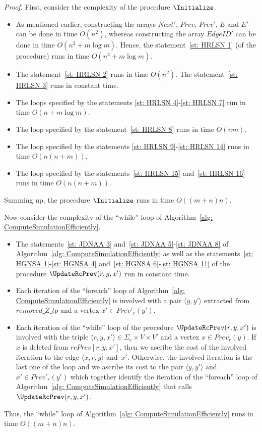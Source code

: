 \documentclass[11pt]{article}
\def\tuple#1{\langle#1\rangle}
\newcommand{\SE}{\Sigma_e}
\newcommand{\Prev}{\mathit{Prev}}
\newcommand{\NextP}{\mathit{Next}'}
\newcommand{\PrevP}{\mathit{Prev}'}
\newcommand{\removeZ}{\textit{removed\_Z\_tp}}
\newcommand{\EdgeIDp}{\mathit{EdgeID}'}
\newcommand{\rcPrev}{\mathit{rcPrev}}
\newenvironment{proof}{
	
	\smallskip
	
	\noindent
	{\em Proof.}}{
	
	\smallskip
	
}
\begin{document}
\begin{proof}
First, consider the complexity of the procedure $\Initialize$.
\begin{itemize}
\item As mentioned earlier, constructing the arrays $\NextP$, $\Prev$, $\PrevP$, $E$ and $E'$ can be done in time $O(n^2)$, whereas constructing the array $\EdgeIDp$ can be done in time $O(n^2 + m\log{m})$. Hence, the statement~\ref{st: HRLSN 1} (of the procedure) runs in time $O(n^2 + m\log{m})$. 
\item The statement~\ref{st: HRLSN 2} runs in time $O(n^2)$. The statement~\ref{st: HRLSN 3} runs in constant time.
\item The loops specified by the statements \ref{st: HRLSN 4}-\ref{st: HRLSN 7} run in time $O(n + m\log{m})$.  
\item The loop specified by the statement~\ref{st: HRLSN 8} runs in time $O(nm)$.  
\item The loop specified by the statements \ref{st: HRLSN 9}-\ref{st: HRLSN 14} runs in time $O(n(n+m))$.  
\item The loop specified by the statements~\ref{st: HRLSN 15} and~\ref{st: HRLSN 16} runs in time $O(n(n+m))$.  
\end{itemize}
Summing up, the procedure $\Initialize$ runs in time $O((m+n)n)$. 

Now consider the complexity of the ``while'' loop of Algorithm~\ref{alg: ComputeSimulationEfficiently}.
\begin{itemize}
\item The statements~\ref{st: JDNAA 3} and~\ref{st: JDNAA 5}-\ref{st: JDNAA 8} of Algorithm~\ref{alg: ComputeSimulationEfficiently} as well as the statements~\ref{st: HGNSA 1}-\ref{st: HGNSA 4} and~\ref{st: HGNSA 6}-\ref{st: HGNSA 11} of the procedure $\UpdateRcPrev(r,y,x')$ run in constant time. 
\item Each iteration of the ``foreach'' loop of Algorithm~\ref{alg: ComputeSimulationEfficiently} is involved with a pair $\tuple{y,y'}$ extracted from $\removeZ$ and a vertex $x' \in \PrevP_r(y')$. 

\item Each iteration of the ``while'' loop of the procedure $\UpdateRcPrev(r,y,x')$ is involved with the triple $\tuple{r,y,x'} \in \SE \times V \times V'$ and a vertex $x \in \Prev_r(y)$. 
%
If $x$ is deleted from $\rcPrev[r,y,x']$, then we ascribe the cost of the involved iteration to the edge $\tuple{x,r,y}$ and~$x'$. Otherwise, the involved iteration is the last one of the loop and we ascribe its cost to the pair $\tuple{y,y'}$ and $x' \in \PrevP_r(y')$ which together identify the iteration of the ``foreach'' loop of Algorithm~\ref{alg: ComputeSimulationEfficiently} that calls $\UpdateRcPrev(r,y,x')$.  
\end{itemize}
Thus, the ``while'' loop of Algorithm~\ref{alg: ComputeSimulationEfficiently} runs in time $O((m+n)n)$. 


\end{proof}
\end{document}
